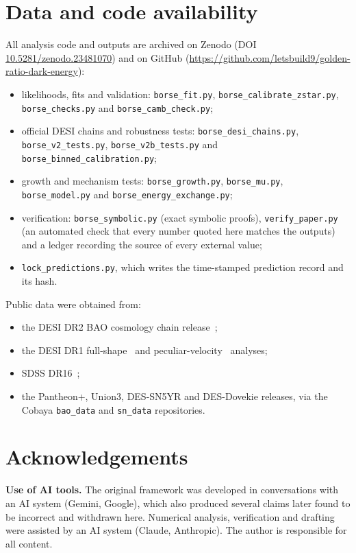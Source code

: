 \documentclass[11pt]{article}
\theoremstyle{definition}
\theoremstyle{remark}
\begin{document}
\section*{Data and code availability}
All analysis code and outputs are archived on Zenodo (DOI \href{https://doi.org/10.5281/zenodo.23481070}{10.5281/zenodo.23481070}) and on GitHub (\url{https://github.com/letsbuild9/golden-ratio-dark-energy}):
{\raggedright
\begin{itemize}
\item likelihoods, fits and validation: \texttt{borse\_fit.py}, \texttt{borse\_calibrate\_zstar.py}, \texttt{borse\_checks.py} and \texttt{borse\_camb\_check.py};
\item official DESI chains and robustness tests: \texttt{borse\_desi\_chains.py}, \texttt{borse\_v2\_tests.py}, \texttt{borse\_v2b\_tests.py} and \texttt{borse\_binned\_calibration.py};
\item growth and mechanism tests: \texttt{borse\_growth.py}, \texttt{borse\_mu.py}, \texttt{borse\_model.py} and \texttt{borse\_energy\_exchange.py};
\item verification: \texttt{borse\_symbolic.py} (exact symbolic proofs), \texttt{verify\_paper.py} (an automated check that every number quoted here matches the outputs) and a ledger recording the source of every external value;
\item \texttt{lock\_predictions.py}, which writes the time-stamped prediction record and its hash.
\end{itemize}
\par}
Public data were obtained from:
\begin{itemize}
\item the DESI DR2 BAO cosmology chain release~\cite{DESIchains};
\item the DESI DR1 full-shape~\cite{DESI-FS} and peculiar-velocity~\cite{DESI-PV} analyses;
\item SDSS DR16~\cite{eBOSS};
\item the Pantheon+, Union3, DES-SN5YR and DES-Dovekie releases, via the Cobaya \texttt{bao\_data} and \texttt{sn\_data} repositories.
\end{itemize}

\section*{Acknowledgements}
\textbf{Use of AI tools.} The original framework was developed in conversations with an AI system (Gemini, Google), which also produced several claims later found to be incorrect and withdrawn here. Numerical analysis, verification and drafting were assisted by an AI system (Claude, Anthropic). The author is responsible for all content.
\end{document}
